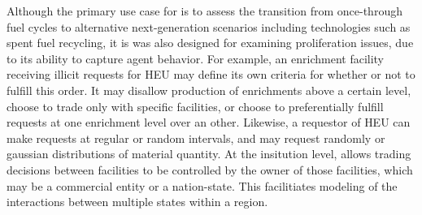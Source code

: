 Although the primary use case for \Cyclus is to assess the transition from once-through fuel cycles to alternative next-generation scenarios including technologies such as spent fuel recycling, it is was also designed for examining proliferation issues, due to its ability to capture agent behavior. For example, an enrichment facility receiving illicit requests for \gls{HEU} may define its own criteria for whether or not to fulfill this order.  It may disallow production of enrichments above a certain level, choose to trade only with specific facilities, or choose to preferentially fulfill requests at one enrichment level over an other.  Likewise, a requestor of \gls{HEU} can make requests at regular or random intervals, and may request randomly or gaussian distributions of material quantity.  At the insitution level, \Cyclus allows trading decisions between facilities to be controlled by the owner of those facilities, which may be a commercial entity or a nation-state.  This facilitiates modeling of the interactions between multiple states within a region.  





